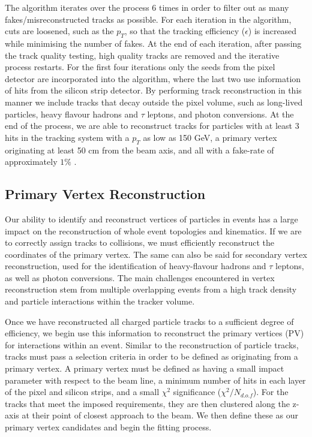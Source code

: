 The algorithm iterates over the process 6 times in order to filter out as many fakes/misreconstructed tracks as possible. For each iteration in 
the algorithm, cuts are loosened, such as the $p_T$, so that the tracking efficiency ($\epsilon$) is increased while minimising the number of 
fakes. At the end of each iteration, after passing the track quality testing, high quality tracks are removed and the iterative process 
restarts. For the first four iterations only the seeds from the pixel detector are incorporated into the algorithm, where the last two use 
information of hits from the silicon strip detector. By performing track reconstruction in this manner we include tracks that decay outside the 
pixel volume, such as long-lived particles, heavy flavour hadrons and $\tau$ leptons, and photon conversions. At the end of the 
process, we are able to reconstruct tracks for particles with at least 3 hits in the tracking system with a $p_T$ as low as 150 GeV, a primary 
vertex originating at least 50 cm from the beam axis, and all with a fake-rate of approximately $1\%$ \cite{1748-0221-9-10-P10009}. 

\subsection{Primary Vertex Reconstruction} \label{subsec-PrimaryVertexReconstruction}

Our ability to identify and reconstruct vertices of particles in events has a large impact on the reconstruction of whole event topologies and kinematics. If we are to correctly assign tracks to collisions, we must efficiently reconstruct the coordinates of the primary vertex. The same can also be said for secondary vertex reconstruction, used for the identification of heavy-flavour hadrons and $\tau$ leptons, as well as photon conversions. The main challenges encountered in vertex reconstruction stem from multiple overlapping events from a high track density and particle interactions within the tracker volume. 

Once we have reconstructed all charged particle tracks to a sufficient degree of efficiency, we begin use this information to reconstruct the primary vertices (PV) for interactions within an event. Similar to the reconstruction of particle tracks, tracks must pass a selection criteria in order to be defined as originating from a primary vertex. A primary vertex must be defined as having a small impact parameter with respect to the beam line, a minimum number of hits in each layer of the pixel and silicon strips, and a small $\chi^2$ significance ($\chi^2/N_{d.o.f}$). For the tracks that meet the imposed requirements, they are then clustered along the z-axis at their point of closest approach to the beam. We then define these as our primary vertex candidates and begin the fitting process.

